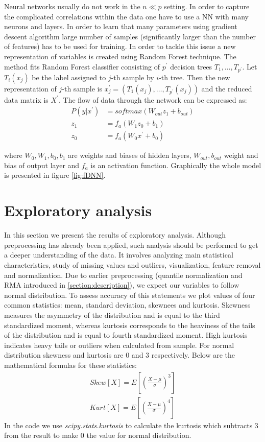\documentclass[12pt, wide]{mwart}
\begin{document}
Neural networks usually do not work in the $n \ll p$ setting. In order to capture the complicated correlations within the data one have to use a NN with many neurons and layers. In order to learn that many parameters using gradient descent algorithm large number of samples (significantly larger than the number of features) has to be used for training. In order to tackle this issue a new representation of variables is created using Random Forest technique. The method fits Random Forest classifier consisting of $p^{\prime}$ decision trees $T_1, \ldots, T_{p^{\prime}}$. Let $T_i(x_j)$ be the label assigned to $j$-th sample by $i$-th tree. Then the new representation of $j$-th sample is $x_j^{\prime} = \left(T_1(x_j), \ldots, T_{p^{\prime}}(x_j)\right)$ and the reduced data matrix is $X^{\prime}$. The flow of data through the network can be expressed as:
\begin{align*} 
P(y | x^{\prime}) &= softmax\left(W_{out}z_1+b_{out}\right) \\ 
z_{1} &=f_a\left(W_1z_0+b_1\right) \\ 
z_{0} &=f_a\left(W_0x^{\prime} +b_0\right) 
\end{align*}

where $W_0, W_1, b_0, b_1$ are weights and biases of hidden layers, $W_{out}, b_{out}$ weight and bias of output layer and $f_a$ is an activation function. Graphically the whole model is presented in figure \ref{fig:fDNN}. 




\section{Exploratory analysis}

In this section we present the results of exploratory analysis. Although preprocessing has already been applied, such analysis should be performed to get a deeper understanding of the data. It involves analyzing main statistical characteristics, study of missing values and outliers, visualization, feature removal and normalization. Due to earlier preprocessing (quantile normalization and RMA introduced in \ref{section:description}), we expect our variables to follow normal distribution. To assess accuracy of this statements we plot values of four common statistics: mean, standard deviation, skewnees and kurtosis. Skewness measures the asymmetry of the distribution and is equal to the third standardized moment, whereas kurtosis corresponds to the heaviness of the tails of the distribution and is equal to fourth standardized moment. High kurtosis indicates heavy tails or outliers when calculated from sample. For normal distribution skewness and kurtosis are $0$ and $3$ respectively. Below are the mathematical formulas for these statistics:
\begin{align}
    Skew[X] = E\left[\left(\frac{X-\mu}{\sigma}\right)^3 \right] \nonumber \\
    Kurt[X] = E\left[\left(\frac{X-\mu}{\sigma}\right)^4 \right] \nonumber
\end{align}
In the code we use \textit{scipy.stats.kurtosis} to calculate the kurtosis which subtracts $3$ from the result to make $0$ the value for normal distribution. 
\end{document}
